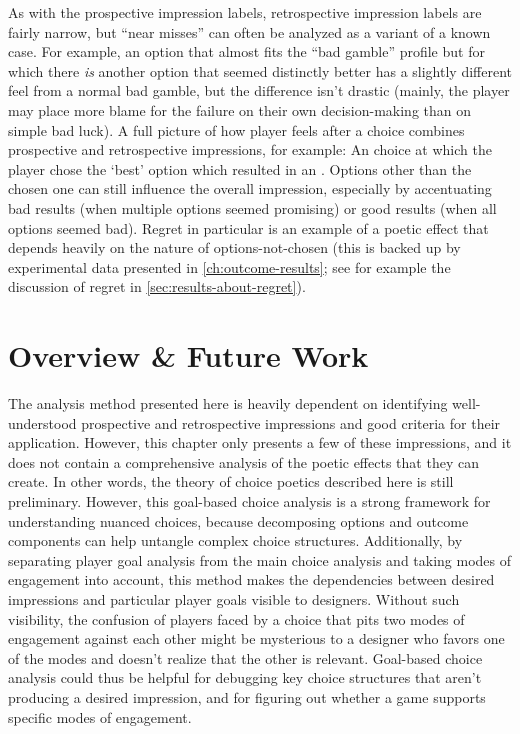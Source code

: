 As with the prospective impression labels, retrospective impression labels are fairly narrow, but ``near misses'' can often be analyzed as a variant of a known case.
%
For example, an option that almost fits the ``bad gamble'' profile but for which there \emph{is} another option that seemed distinctly better has a slightly different feel from a normal bad gamble, but the difference isn't drastic (mainly, the player may place more blame for the failure on their own decision-making than on simple bad luck).
%
A full picture of how player feels after a choice combines prospective and retrospective impressions, for example: An  choice at which the player chose the `best' option which resulted in an .
%
Options other than the chosen one can still influence the overall impression, especially by accentuating bad results (when multiple options seemed promising) or good results (when all options seemed bad).
%
Regret in particular is an example of a poetic effect that depends heavily on the nature of options-not-chosen (this is backed up by experimental data presented in \cref{ch:outcome-results}; see for example the discussion of regret in \cref{sec:results-about-regret}).


\section{Overview \& Future Work}

The analysis method presented here is heavily dependent on identifying well-understood prospective and retrospective impressions and good criteria for their application.
%
However, this chapter only presents a few of these impressions, and it does not contain a comprehensive analysis of the poetic effects that they can create.
%
In other words, the theory of choice poetics described here is still preliminary.
%
However, this goal-based choice analysis is a strong framework for understanding nuanced choices, because decomposing options and outcome components can help untangle complex choice structures.
%
Additionally, by separating player goal analysis from the main choice analysis and taking modes of engagement into account, this method makes the dependencies between desired impressions and particular player goals visible to designers.
%
Without such visibility, the confusion of players faced by a choice that pits two modes of engagement against each other might be mysterious to a designer who favors one of the modes and doesn't realize that the other is relevant.
%
Goal-based choice analysis could thus be helpful for debugging key choice structures that aren't producing a desired impression, and for figuring out whether a game supports specific modes of engagement.


